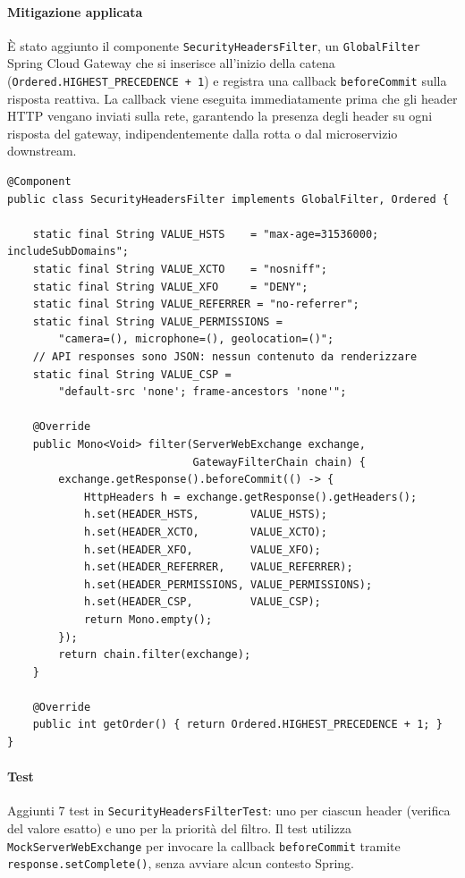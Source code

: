 ﻿\documentclass[a4paper,12pt]{report}
\begin{document}
\paragraph{Mitigazione applicata}
È stato aggiunto il componente \texttt{SecurityHeadersFilter}, un \texttt{GlobalFilter}
Spring Cloud Gateway che si inserisce all'inizio della catena
(\texttt{Ordered.HIGHEST\_PRECEDENCE + 1}) e registra una callback \texttt{beforeCommit}
sulla risposta reattiva. La callback viene eseguita immediatamente prima che gli header HTTP
vengano inviati sulla rete, garantendo la presenza degli header su ogni risposta del gateway,
indipendentemente dalla rotta o dal microservizio downstream.

\begin{securebox}[title={SecurityHeadersFilter.java --- GlobalFilter (api-gateway)}]
\begin{lstlisting}[style=java]
@Component
public class SecurityHeadersFilter implements GlobalFilter, Ordered {

    static final String VALUE_HSTS    = "max-age=31536000; includeSubDomains";
    static final String VALUE_XCTO    = "nosniff";
    static final String VALUE_XFO     = "DENY";
    static final String VALUE_REFERRER = "no-referrer";
    static final String VALUE_PERMISSIONS =
        "camera=(), microphone=(), geolocation=()";
    // API responses sono JSON: nessun contenuto da renderizzare
    static final String VALUE_CSP =
        "default-src 'none'; frame-ancestors 'none'";

    @Override
    public Mono<Void> filter(ServerWebExchange exchange,
                             GatewayFilterChain chain) {
        exchange.getResponse().beforeCommit(() -> {
            HttpHeaders h = exchange.getResponse().getHeaders();
            h.set(HEADER_HSTS,        VALUE_HSTS);
            h.set(HEADER_XCTO,        VALUE_XCTO);
            h.set(HEADER_XFO,         VALUE_XFO);
            h.set(HEADER_REFERRER,    VALUE_REFERRER);
            h.set(HEADER_PERMISSIONS, VALUE_PERMISSIONS);
            h.set(HEADER_CSP,         VALUE_CSP);
            return Mono.empty();
        });
        return chain.filter(exchange);
    }

    @Override
    public int getOrder() { return Ordered.HIGHEST_PRECEDENCE + 1; }
}
\end{lstlisting}
\end{securebox}

\paragraph{Test} Aggiunti 7 test in \texttt{SecurityHeadersFilterTest}:
uno per ciascun header (verifica del valore esatto) e uno per la priorità del filtro.
Il test utilizza \texttt{MockServerWebExchange} per invocare la callback \texttt{beforeCommit}
tramite \texttt{response.setComplete()}, senza avviare alcun contesto Spring.
\end{document}
